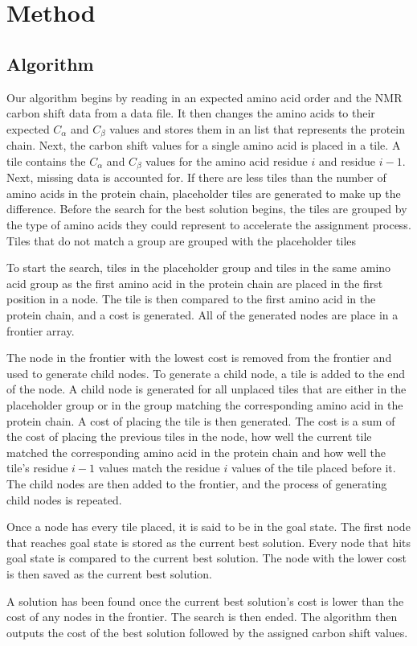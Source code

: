 \documentclass[12pt]{article}
\begin{document}
\section{Method} %
\label{sec:method}

\subsection{Algorithm} %
\label{sub:algorithm}
Our algorithm begins by reading in an expected amino acid order and the NMR carbon shift data from a data file. It then changes the amino acids to their expected $C_\alpha$ and $C_{\beta}$ values and stores them in an list that represents the protein chain. Next, the carbon shift values for a single amino acid is placed in a tile. A tile contains the $C_\alpha$ and $C_{\beta}$ values for the amino acid residue $i$ and residue $i-1$. Next, missing data is accounted for. If there are less tiles than the number of amino acids in the protein chain, placeholder tiles are generated to make up the difference. Before the search for the best solution begins, the tiles are grouped by the type of amino acids they could represent to accelerate the assignment process. Tiles that do not match a group are grouped with the placeholder tiles

To start the search, tiles in the placeholder group and tiles in the same amino acid group as the first amino acid in the protein chain are placed in the first position in a node. The tile is then compared to the first amino acid in the protein chain, and a cost is generated. All of the generated nodes are place in a frontier array. 

The node in the frontier with the lowest cost is removed from the frontier and used to generate child nodes. To generate a child node, a tile is added to the end of the node. A child node is generated for all unplaced tiles that are either in the placeholder group or in the group matching the corresponding amino acid in the protein chain. A cost of placing the tile is then generated. The cost is a sum of the cost of placing the previous tiles in the node, how well the current tile matched the corresponding amino acid in the protein chain and how well the tile's residue $i-1$ values match the residue $i$ values of the tile placed before it. The child nodes are then added to the frontier, and the process of generating child nodes is repeated. 

Once a node has every tile placed, it is said to be in the goal state. The first node that reaches goal state is stored as the current best solution. Every node that hits goal state is compared to the current best solution. The node with the lower cost is then saved as the current best solution. 

A solution has been found once the current best solution's cost is lower than the cost of any nodes in the frontier. The search is then ended. The algorithm then outputs the cost of the best solution followed by the assigned carbon shift values. 
\cite{guntert_automated_2009} \cite{Alipanahi09ipass:error} \cite{babak_alipanahi_error_2011}



\end{document}

